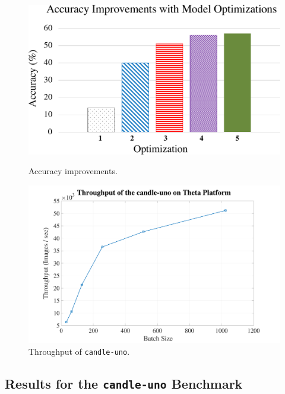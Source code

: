 \begin{figure}[!htb]
    \begin{center}
    \begin{minipage}[b]{0.45\textwidth}
    \centering
    \includegraphics[width=1\columnwidth]{images/stemdl/image6.pdf}
    \caption{Accuracy improvements.}
    \label{fig:stemdl6}
    \end{minipage}
    \hfill
    \begin{minipage}[b]{0.45\textwidth}
    \centering
    \includegraphics[width=1.0\columnwidth]{images/uno/image7.pdf}
    \caption{Throughput of {\tt candle-uno}.}
    \label{fig:uno-7}
    \end{minipage}
    \end{center}
\end{figure}




\subsection{Results for the {\tt candle-uno} Benchmark}

